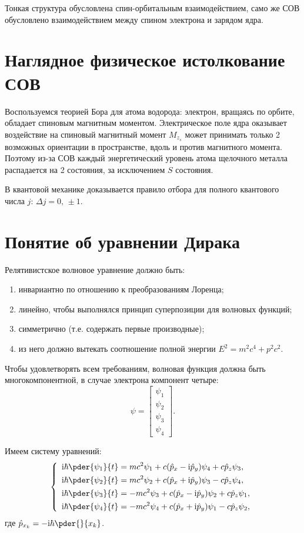 Тонкая структура обусловлена спин-орбитальным взаимодействием, само же СОВ
обусловлено взаимодействием между спином электрона и зарядом ядра.

\section{Наглядное физическое истолкование СОВ}
Воспользуемся теорией Бора для атома водорода: электрон, вращаясь по орбите,
обладает спиновым магнитным моментом. Электрическое поле ядра оказывает
воздействие на спиновый магнитный момент \( M_{z_s} \) может принимать только 2
возможных ориентации в пространстве, вдоль и против магнитного момента. Поэтому
из-за СОВ каждый энергетический уровень атома щелочного металла распадается на 2
состояния, за исключением \( S \) состояния.

В квантовой механике доказывается правило отбора для полного квантового числа
\( j \): \( \Delta j = 0,\, \pm 1 \).

\section{Понятие об уравнении Дирака}
 
Релятивистское волновое уравнение должно быть:
\begin{enumerate}
    \item инвариантно по отношению к преобразованиям Лоренца;
    \item линейно, чтобы выполнялся принцип суперпозиции для волновых функций;
    \item симметрично (т.е. содержать первые производные);
    \item из него должно вытекать соотношение полной энергии \( E^2 = m^2c^4 +
p^2c^2 \).
\end{enumerate}

Чтобы удовлетворять всем требованиям, волновая функция должна быть
многокомпонентной, в случае электрона компонент четыре:
\[
    \psi = \begin{bmatrix} \psi_1 \\ \psi_2 \\ \psi_3 \\ \psi_4 \end{bmatrix}.
\]

Имеем систему уравнений:
\[
    \left\{ \begin{array}{l}
        \ds \i\hbar\pder{\psi_1}{t} = mc^2\psi_1 + c(\hat{p}_x - \i\hat{p}_y)
        \psi_4 + c\hat{p}_z\psi_3, \\[.4em]
        \ds \i\hbar\pder{\psi_2}{t} = mc^2\psi_2 + c(\hat{p}_x + \i\hat{p}_y)
        \psi_3 - c\hat{p}_z\psi_4, \\[.4em]
        \ds \i\hbar\pder{\psi_3}{t} = -mc^2\psi_3 + c(\hat{p}_x - \i\hat{p}_y)
        \psi_2 + c\hat{p}_z\psi_1, \\[.4em]
        \ds \i\hbar\pder{\psi_4}{t} = -mc^2\psi_4 + c(\hat{p}_x + \i\hat{p}_y)
        \psi_1 - c\hat{p}_z\psi_2,
    \end{array} \right.
\]
где \( \ds \hat{p}_{x_k} = -\i\hbar\pder{}{x_k} \).

